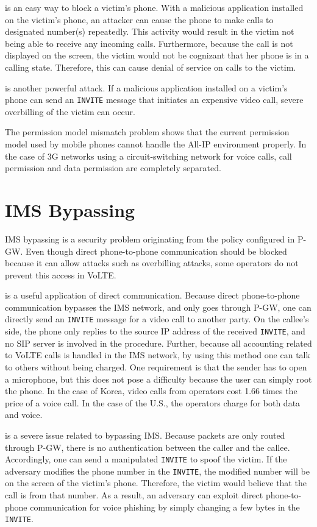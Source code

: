  is an easy way to block a victim's phone.  With a
malicious application installed on the victim's phone, an attacker can cause the
phone to make calls to designated number(s) repeatedly. This activity would result in 
the victim not being able to receive any incoming calls. 
Furthermore, because the call is not displayed on the screen, the
victim would not be cognizant that her phone is in a calling state. Therefore, this can
cause denial of service on calls to the victim.

 is another powerful attack. If a malicious application
installed on a victim's phone can send an {\tt INVITE} message that initiates
an expensive video call, severe overbilling of the victim can occur.

The permission model mismatch problem shows that the current
permission model used by mobile phones cannot handle the All-IP
environment properly. In the case of 3G networks using a circuit-switching network for
voice calls, call permission and data permission are completely
separated.

\section{IMS Bypassing}
IMS bypassing is a security problem originating from the policy
configured in P-GW.  Even though direct phone-to-phone communication should be
blocked because it can allow attacks such as overbilling attacks, some operators
do not prevent this access in VoLTE.

 is a useful application of direct communication.  Because
direct phone-to-phone communication bypasses the IMS network, and only goes
through P-GW, one can directly send an {\tt INVITE} message for a video call to another party.
 On the callee's side, the phone only replies to the source IP address of
the received {\tt INVITE}, and no SIP server is involved in the procedure.  Further, because all
accounting related to VoLTE calls is handled in the IMS network, by using this method one can talk to
others without being charged. One requirement is that the sender has to open a
microphone, but this does not pose a difficulty because the user can simply root the
phone. In the case of Korea, video calls from operators cost 1.66 times
the price of a voice call. In the case of the U.S., the operators charge
for both data and voice.

 is a severe issue related to bypassing IMS. Because
packets are only routed through P-GW, there is no authentication between the
caller and the callee.  Accordingly, one can send a manipulated {\tt INVITE} to
spoof the victim.  If the adversary modifies the phone number in the {\tt INVITE},
the modified number will be on the screen of the victim's phone. Therefore, the victim
would believe that the call is from that number.  As a result, an adversary can
exploit direct phone-to-phone communication for voice phishing by simply changing a
few bytes in the {\tt INVITE}.



